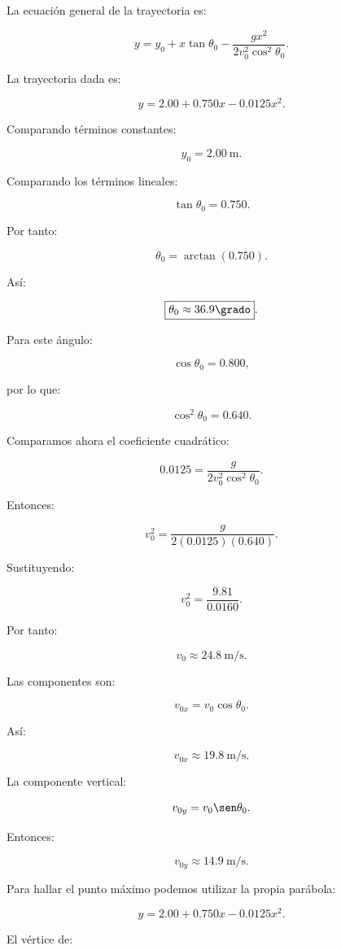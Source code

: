 \begin{explicacion}
La ecuación general de la trayectoria es:

\[
y
=
y_0
+
x\tan\theta_0
-
\frac{
gx^2
}{
2v_0^2\cos^2\theta_0
}.
\]

La trayectoria dada es:

\[
y
=
2.00
+
0.750x
-
0.0125x^2.
\]

Comparando términos constantes:

\[
\boxed{
y_0=\SI{2.00}{\meter}
}.
\]

Comparando los términos lineales:

\[
\tan\theta_0=0.750.
\]

Por tanto:

\[
\theta_0
=
\arctan(0.750).
\]

Así:

\[
\boxed{
\theta_0\approx36.9\grado
}.
\]

Para este ángulo:

\[
\cos\theta_0=0.800,
\]

por lo que:

\[
\cos^2\theta_0=0.640.
\]

Comparamos ahora el coeficiente cuadrático:

\[
0.0125
=
\frac{
g
}{
2v_0^2\cos^2\theta_0
}.
\]

Entonces:

\[
v_0^2
=
\frac{
g
}{
2(0.0125)(0.640)
}.
\]

Sustituyendo:

\[
v_0^2
=
\frac{
9.81
}{
0.0160
}.
\]

Por tanto:

\[
\boxed{
v_0\approx\SI{24.8}{\meter\per\second}
}.
\]

Las componentes son:

\[
v_{0x}
=
v_0\cos\theta_0.
\]

Así:

\[
\boxed{
v_{0x}\approx\SI{19.8}{\meter\per\second}
}.
\]

La componente vertical:

\[
v_{0y}
=
v_0\sen\theta_0.
\]

Entonces:

\[
\boxed{
v_{0y}\approx\SI{14.9}{\meter\per\second}
}.
\]

Para hallar el punto máximo podemos utilizar la propia parábola:

\[
y
=
2.00+0.750x-0.0125x^2.
\]

El vértice de:


\end{explicacion}
